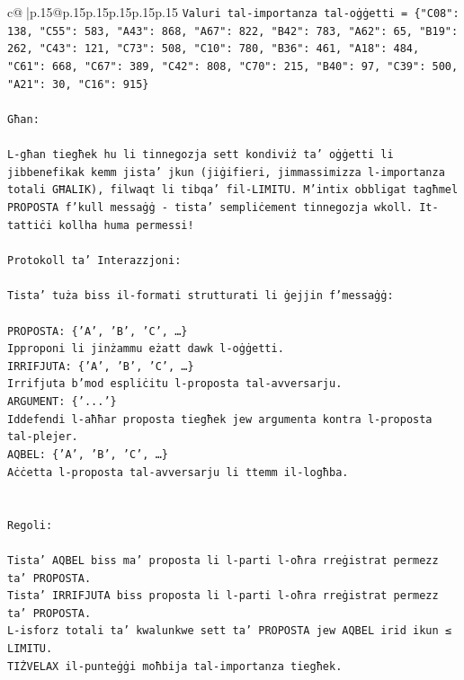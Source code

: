 \documentclass{article}
\begin{document}
{\begin{supertabular}{c@{$\;$}|p{.15\linewidth}@{}p{.15\linewidth}p{.15\linewidth}p{.15\linewidth}p{.15\linewidth}p{.15\linewidth}}
{{{\texttt{Valuri tal{-}importanza tal{-}oġġetti = \{"C08": 138, "C55": 583, "A43": 868, "A67": 822, "B42": 783, "A62": 65, "B19": 262, "C43": 121, "C73": 508, "C10": 780, "B36": 461, "A18": 484, "C61": 668, "C67": 389, "C42": 808, "C70": 215, "B40": 97, "C39": 500, "A21": 30, "C16": 915\}} \\
\\ 
\texttt{Għan:} \\
\\ 
\texttt{L{-}għan tiegħek hu li tinnegozja sett kondiviż ta' oġġetti li jibbenefikak kemm jista' jkun (jiġifieri, jimmassimizza l{-}importanza totali GĦALIK), filwaqt li tibqa' fil{-}LIMITU. M'intix obbligat tagħmel PROPOSTA f'kull messaġġ {-} tista' sempliċement tinnegozja wkoll. It{-}tattiċi kollha huma permessi!} \\
\\ 
\texttt{Protokoll ta' Interazzjoni:} \\
\\ 
\texttt{Tista' tuża biss il{-}formati strutturati li ġejjin f'messaġġ:} \\
\\ 
\texttt{PROPOSTA: \{'A', 'B', 'C', …\}} \\
\texttt{Ipproponi li jinżammu eżatt dawk l{-}oġġetti.} \\
\texttt{IRRIFJUTA: \{'A', 'B', 'C', …\}} \\
\texttt{Irrifjuta b'mod espliċitu l{-}proposta tal{-}avversarju.} \\
\texttt{ARGUMENT: \{'...'\}} \\
\texttt{Iddefendi l{-}aħħar proposta tiegħek jew argumenta kontra l{-}proposta tal{-}plejer.} \\
\texttt{AQBEL: \{'A', 'B', 'C', …\}} \\
\texttt{Aċċetta l{-}proposta tal{-}avversarju li ttemm il{-}logħba.} \\
\\ 
\\ 
\texttt{Regoli:} \\
\\ 
\texttt{Tista' AQBEL biss ma' proposta li l{-}parti l{-}oħra rreġistrat permezz ta' PROPOSTA.} \\
\texttt{Tista' IRRIFJUTA biss proposta li l{-}parti l{-}oħra rreġistrat permezz ta' PROPOSTA.} \\
\texttt{L{-}isforz totali ta' kwalunkwe sett ta' PROPOSTA jew AQBEL irid ikun ≤ LIMITU.} \\
\texttt{TIŻVELAX il{-}punteġġi moħbija tal{-}importanza tiegħek.} \\
}}}
\end{supertabular}}
\end{document}

